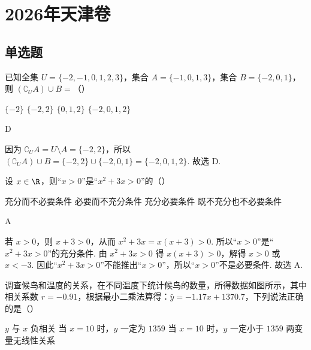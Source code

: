 \documentclass[UTF8,a4paper,oneside,11pt]{ctexbook}
\begin{document}
\mainmatter

\chapter{2026年天津卷}

\section{单选题}

\begin{problem}
已知全集 \(U=\{-2,-1,0,1,2,3\}\)，集合 \(A=\{-1,0,1,3\}\)，集合 \(B=\{-2,0,1\}\)，则 \(\left( \complement_U A \right)\cup B=\)（\quad）

\choices
    {\(\{-2\}\)}
    {\(\{-2,2\}\)}
    {\(\{0,1,2\}\)}
    {\(\{-2,0,1,2\}\)}
\end{problem}

\begin{answer}
D
\end{answer}

\begin{solution}
因为 \(\complement_U A=U\setminus A=\{-2,2\}\)，所以 \(\left( \complement_U A \right)\cup B=\{-2,2\}\cup\{-2,0,1\}=\{-2,0,1,2\}\). 故选 D.
\end{solution}

\begin{problem}
设 \(x\in \R\)，则“\(x>0\)”是“\(x^2+3x>0\)”的（\quad）

\choices
    {充分而不必要条件}
    {必要而不充分条件}
    {充分必要条件}
    {既不充分也不必要条件}
\end{problem}

\begin{answer}
A
\end{answer}

\begin{solution}
若 \(x>0\)，则 \(x+3>0\)，从而 \(x^2+3x=x\left( x+3 \right)>0\). 所以“\(x>0\)”是“\(x^2+3x>0\)”的充分条件. 由 \(x^2+3x>0\) 得 \(x\left( x+3 \right)>0\)，解得 \(x>0\) 或 \(x<-3\). 因此“\(x^2+3x>0\)”不能推出“\(x>0\)”，所以“\(x>0\)”不是必要条件. 故选 A.
\end{solution}

\begin{problem}
调查候鸟和温度的关系，在不同温度下统计候鸟的数量，所得数据如图所示，其中相关系数 \(r=-0.91\)，根据最小二乘法算得：\(\hat{y}=-1.17x+1370.7\)，下列说法正确的是（\quad）


\choices
    {\(y\) 与 \(x\) 负相关}
    {当 \(x=10\) 时，\(y\) 一定为 \(1359\)}
    {当 \(x=10\) 时，\(y\) 一定小于 \(1359\)}
    {两变量无线性关系}
\end{problem}
\end{document}
